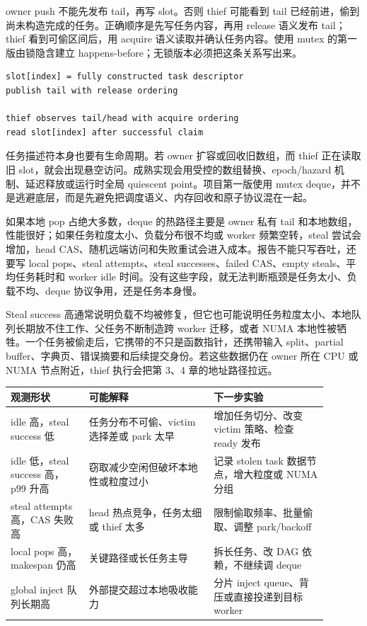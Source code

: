 owner push 不能先发布 tail，再写 slot。否则 thief 可能看到 tail 已经前进，偷到尚未构造完成的任务。正确顺序是先写任务内容，再用 release 语义发布 tail；thief 看到可偷区间后，用 acquire 语义读取并确认任务内容。使用 mutex 的第一版由锁隐含建立 happens-before；无锁版本必须把这条关系写出来。

\begin{lstlisting}[numbers=none,caption={push 发布顺序的抽象}]
slot[index] = fully constructed task descriptor
publish tail with release ordering

thief observes tail/head with acquire ordering
read slot[index] after successful claim
\end{lstlisting}

任务描述符本身也要有生命周期。若 owner 扩容或回收旧数组，而 thief 正在读取旧 slot，就会出现悬空访问。成熟实现会用受控的数组替换、epoch/hazard 机制、延迟释放或运行时全局 quiescent point。项目第一版使用 mutex deque，并不是逃避底层，而是先避免把调度语义、内存回收和原子协议混在一起。

如果本地 pop 占绝大多数，deque 的热路径主要是 owner 私有 tail 和本地数组，性能很好；如果任务粒度太小、负载分布很不均或 worker 频繁空转，steal 尝试会增加，head CAS、随机远端访问和失败重试会进入成本。报告不能只写吞吐，还要写 local pops、steal attempts、steal successes、failed CAS、empty steals、平均任务耗时和 worker idle 时间。没有这些字段，就无法判断瓶颈是任务太小、负载不均、deque 协议争用，还是任务本身慢。

Steal success 高通常说明负载不均被修复，但它也可能说明任务粒度太小、本地队列长期放不住工作、父任务不断制造跨 worker 迁移，或者 NUMA 本地性被牺牲。一个任务被偷走后，它携带的不只是函数指针，还携带输入 split、partial buffer、字典页、错误摘要和后续提交身份。若这些数据仍在 owner 所在 CPU 或 NUMA 节点附近，thief 执行会把第 3、4 章的地址路径拉远。

\begin{center}
\small
\begin{tabular}{@{}p{0.22\linewidth}p{0.35\linewidth}p{0.32\linewidth}@{}}
\toprule
观测形状 & 可能解释 & 下一步实验 \\
\midrule
idle 高，steal success 低 & 任务分布不可偷、victim 选择差或 park 太早 & 增加任务切分、改变 victim 策略、检查 ready 发布 \\
idle 低，steal success 高，p99 升高 & 窃取减少空闲但破坏本地性或粒度过小 & 记录 stolen task 数据节点，增大粒度或 NUMA 分组 \\
steal attempts 高，CAS 失败高 & head 热点竞争，任务太细或 thief 太多 & 限制偷取频率、批量偷取、调整 park/backoff \\
local pops 高，makespan 仍高 & 关键路径或长任务主导 & 拆长任务、改 DAG 依赖，不继续调 deque \\
global inject 队列长期高 & 外部提交超过本地吸收能力 & 分片 inject queue、背压或直接投递到目标 worker \\
\bottomrule
\end{tabular}
\end{center}

